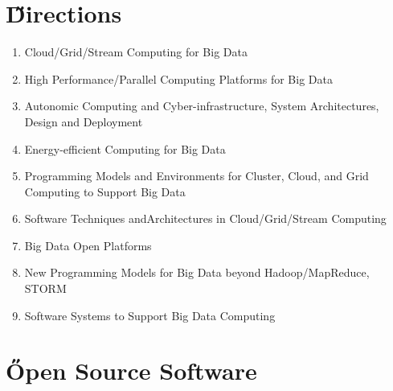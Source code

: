 \documentclass[a4paper,12pt,oneside]{book}
\begin{document}
\section{\H Directions}
\begin{enumerate}
	\item Cloud/Grid/Stream Computing for Big Data
	\item High Performance/Parallel Computing Platforms for Big Data
	\item Autonomic Computing and Cyber-infrastructure, System Architectures, Design and Deployment
	\item Energy-efficient Computing for Big Data
	\item Programming Models and Environments for Cluster, Cloud, and Grid Computing to Support Big Data
	\item Software Techniques andArchitectures in Cloud/Grid/Stream Computing
	\item Big Data Open Platforms
	\item New Programming Models for Big Data beyond Hadoop/MapReduce, STORM
	\item Software Systems to Support Big Data Computing
\end{enumerate}


\section{\H Open Source Software}
\end{document}
